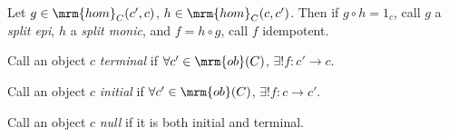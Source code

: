 \documentclass[nocover]{pset}
\newcommand{\ob}{\mrm{ob}}
\newcommand{\homm}{\mrm{hom}}
\begin{document}
Let $g \in \homm_C(c',c)$, $h \in \homm_C(c,c')$. Then if $g\circ h =
1_c$, call $g$ a \emph{split epi}, $h$ a \emph{split monic}, and $f =
h\circ g$, call $f$ idempotent.

\begin{definition}[Terminal]
  Call an object $c$ \emph{terminal} if $\forall c' \in \ob(C)$,
  $\exists ! f : c' \to c$. \\
\end{definition}

\begin{definition}[Initial]
  Call an object $c$ \emph{initial} if $\forall c' \in \ob(C)$,
  $\exists ! f : c \to c'$. \\
\end{definition}

\begin{definition}[Null]
  Call an object $c$ \emph{null} if it is both initial and terminal.
\end{definition}
\end{document}
